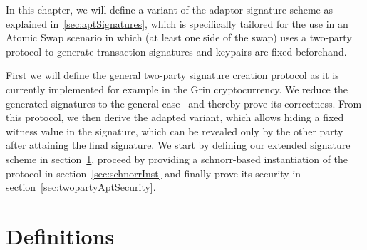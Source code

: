 In this chapter, we will define a variant of the adaptor signature scheme as explained in~\ref{sec:aptSignatures},
which is specifically tailored for the use in an Atomic Swap scenario in which (at least one side of the swap) uses a two-party protocol to generate transaction signatures and keypairs are fixed beforehand.

First we will define the general two-party signature creation protocol as it is currently implemented for example in the Grin cryptocurrency.
We reduce the generated signatures to the general case~\cite{schnorr1989efficient} and thereby prove its correctness.
From this protocol, we then derive the adapted variant, which allows hiding a fixed witness
value in the signature, which can be revealed only by the other party after attaining the final signature.
We start by defining our extended signature scheme in section~\ref{sec:definitions}, proceed by providing a schnorr-based instantiation of the protocol in section~\ref{sec:schnorrInst} and finally prove its security in section~\ref{sec:twopartyAptSecurity}.

\section{Definitions}\label{sec:definitions}

